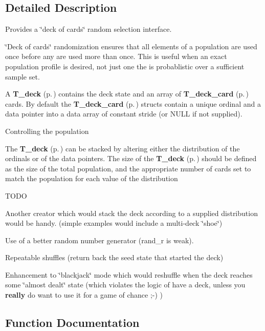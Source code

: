 \subsection{Detailed Description}
Provides a \char`\"{}deck of cards\char`\"{} random selection interface.

\char`\"{}Deck of cards\char`\"{} randomization ensures that all elements of a population are used once before any are used more than once. This is useful when an exact population profile is desired, not just one the is probablistic over a sufficient sample set.

A {\bf T\_\-deck} {\rm (p.\,\pageref{structT__deck})} contains the deck state and an array of {\bf T\_\-deck\_\-card} {\rm (p.\,\pageref{structT__deck__card})} cards. By default the {\bf T\_\-deck\_\-card} {\rm (p.\,\pageref{structT__deck__card})} structs contain a unique ordinal and a data pointer into a data array of constant stride (or NULL if not supplied).

Controlling the population

The {\bf T\_\-deck} {\rm (p.\,\pageref{structT__deck})} can be stacked by altering either the distribution of the ordinals or of the data pointers. The size of the {\bf T\_\-deck} {\rm (p.\,\pageref{structT__deck})} should be defined as the size of the total population, and the appropriate number of cards set to match the population for each value of the distribution

 TODO\begin{CompactItemize}
\item 
Another creator which would stack the deck according to a supplied distribution would be handy. (simple examples would include a multi-deck \char`\"{}shoe\char`\"{})\item 
Use of a better random number generator (rand\_\-r is weak).\item 
Repeatable shuffles (return back the seed state that started the deck)\item 
Enhancement to \char`\"{}blackjack\char`\"{} mode which would reshuffle when the deck reaches some \char`\"{}almost dealt\char`\"{} state (which violates the logic of have a deck, unless you {\bf really} do want to use it for a game of chance ;-) ) \end{CompactItemize}


\subsection{Function Documentation}
